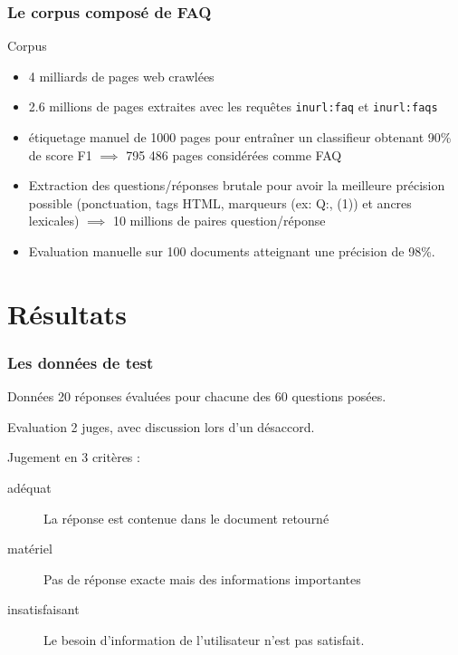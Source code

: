 \documentclass[10pt]{beamer}
\begin{document}
\begin{frame}
  \frametitle{Le corpus composé de FAQ}
  \begin{block}{Corpus}
  \begin{itemize}
    \item 4 milliards de pages web crawlées
    \item 2.6 millions de pages extraites avec les requ\^etes \og \verb?inurl:faq? \fg{} et \og \verb?inurl:faqs? \fg{} 
  	\item étiquetage manuel de 1000 pages pour entraîner un classifieur obtenant 90\% de score F1 $\implies$ 795 486 pages considérées comme FAQ
  	\item Extraction des questions/réponses brutale pour avoir la meilleure précision possible (ponctuation, tags HTML, marqueurs (ex: Q:, (1)) et ancres lexicales) $\implies$ 10 millions de paires question/réponse
  	\item Evaluation manuelle sur 100 documents atteignant une précision de 98\%.
  \end{itemize}
  \end{block}
\end{frame}


\section{Résultats}
\label{sec:results}


\begin{frame}
  \frametitle{Les données de test}
  \begin{block}{Données}
    20 réponses évaluées pour chacune des 60 questions posées.
  \end{block}

  \pause

  \begin{block}{Evaluation}
    2 juges, avec discussion lors d'un désaccord.
    
    Jugement en 3 critères :
    \begin{description}
    \item[adéquat] La réponse est contenue dans le document retourné
    \item[matériel] Pas de réponse exacte mais des informations importantes
    \item[insatisfaisant] Le besoin d'information de l'utilisateur
      n'est pas satisfait.
    \end{description}
  \end{block}
\end{frame}
\end{document}
